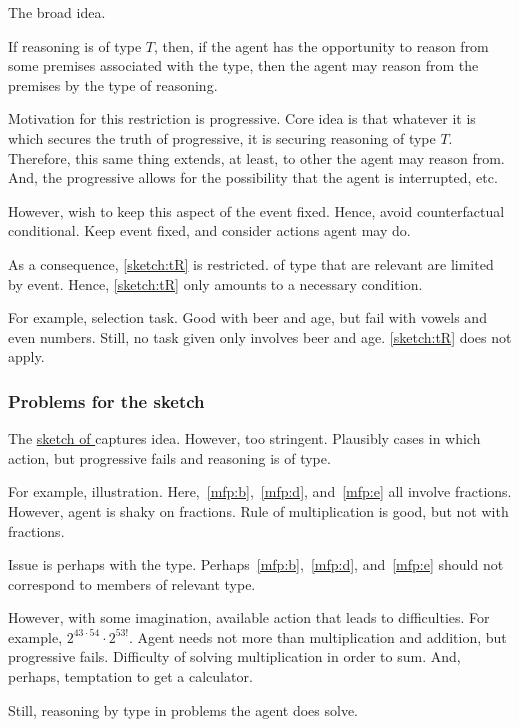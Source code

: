 \begin{note}
  The broad idea.

  If reasoning is of type \(T\), then, if the agent has the opportunity to reason from some premises associated with the type, then the agent may reason from the premises by the type of reasoning.

  Motivation for this restriction is progressive.
  Core idea is that whatever it is which secures the truth of progressive, it is securing reasoning of type \(T\).
  Therefore, this same thing extends, at least, to other  the agent may reason from.
  And, the progressive allows for the possibility that the agent is interrupted, etc.

  However, wish to keep this aspect of the event fixed.
  Hence, avoid counterfactual conditional.
  Keep event fixed, and consider actions agent may do.

  As a consequence, \autoref{sketch:tR} is restricted.
   of type that are relevant are limited by event.
  Hence, \autoref{sketch:tR} only amounts to a necessary condition.

  For example, selection task.
  Good with beer and age, but fail with vowels and even numbers.
  Still, no task given only involves beer and age.
  \autoref{sketch:tR} does not apply.
\end{note}

\subsubsection{Problems for the sketch}
\label{cha:typical:sec:tor:g-s:three-problems}
\nocite{Wilson:1994aa}

\begin{note}
  The \hyperref[sketch:tR]{sketch of \tRN{}} captures idea.
  However, too stringent.
  Plausibly cases in which action, but progressive fails and reasoning is of type.
\end{note}

\begin{note}
  For example, illustration.
  Here,~\ref{mfp:b},~\ref{mfp:d}, and~\ref{mfp:e} all involve fractions.
  However, agent is shaky on fractions.
  Rule of multiplication is good, but not with fractions.

  Issue is perhaps with the type.
  Perhaps~\ref{mfp:b},~\ref{mfp:d}, and~\ref{mfp:e} should not correspond to members of relevant type.

  However, with some imagination, available action that leads to difficulties.
  For example, \(2^{43 \cdot 54} \cdot 2^{53!}\).
  Agent needs not more than multiplication and addition, but progressive fails.
  Difficulty of solving multiplication in order to sum.
  And, perhaps, temptation to get a calculator.

  Still, reasoning by type in problems the agent does solve.
\end{note}


